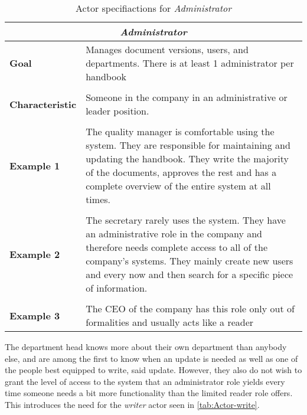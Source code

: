\begin{table}[H]
	\centering
	\begin{tabular}{l p{11.3cm}}
		\hline
		\multicolumn{2}{c}{\textbf{\textit{Administrator}}}\\
		\hline

		\textbf{Goal} &  Manages document versions, users, and departments. There is at least 1 administrator per handbook\\
		 &  \\

		\textbf{Characteristic} & Someone in the company in an administrative or leader position.\\
		&  \\

		\textbf{Example 1}
		& The quality manager is comfortable using the system.
		They are responsible for maintaining and updating the handbook.
		They write the majority of the documents, approves the rest and has a complete overview of the entire system at all times. \\
		&  \\

		\textbf{Example 2}
		& The secretary rarely uses the system.
		They have an administrative role in the company and therefore needs complete access to all of the company's systems.
		They mainly create new users and every now and then search for a specific piece of information.\\
		&  \\

		\textbf{Example 3}
		& The CEO of the company has this role only out of formalities and usually acts like a reader\\
		\hline
	\end{tabular}
\caption{Actor specifiactions for \textit{Administrator}}\label{tab:Actor-admin}
\end{table}

The department head knows more about their own department than anybody else, and are among the first to know when an update is needed as well as one of the people best equipped to write, said update.
However, they also do not wish to grant the level of access to the system that an administrator role yields every time someone needs a bit more functionality than the limited reader role offers.
This introduces the need for the \textit{writer} actor seen in \cref{tab:Actor-write}.

